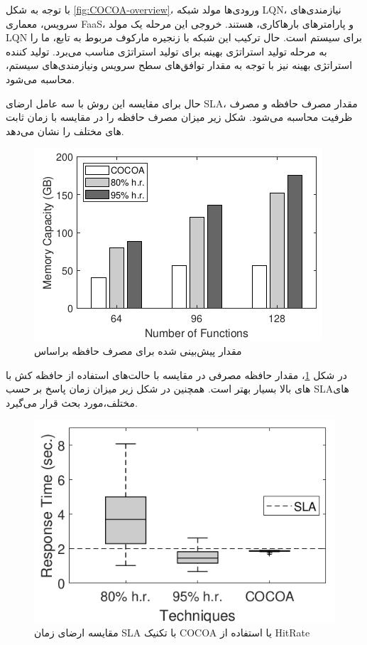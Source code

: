 با توجه به شکل \ref{fig:COCOA-overview}، ورودی‌ها مولد شبکه LQN، نیازمندی‌های سرویس، معماری FaaS، و پارامتر‌های بار‌ها‌کاری، هستند. خروجی این مرحله یک مولد LQN برای سیستم است. حال ترکیب این شبکه با زنجیره مارکوف مربوط به تابع، ما را به مرحله تولید استراتژی بهینه برای تولید استراتژی مناسب می‌برد. تولید کننده استراتژی بهینه نیز با توجه به مقدار توافق‌های سطح سرویس ونیازمندی‌های سیستم، محاسبه می‌شود. 

حال برای مقایسه این روش با  سه عامل ارضای SLA، مقدار مصرف حافظه و مصرف ظرفیت محاسبه می‌شود. 
شکل زیر میزان مصرف حافظه را در مقایسه با زمان ثابت های مختلف را نشان می‌دهد. 

\begin{figure}
	\centering
	\includegraphics[width=0.7\linewidth]{figs/COCOA-memory-predicted-capacity}
	\caption {مقدار پیش‌بینی شده برای مصرف حافظه براساس }
	\label{fig:COCOA-memory-predicted-capacity}
\end{figure}

در شکل \ref{fig:COCOA-memory-predicted-capacity}، مقدار حافظه مصرفی در مقایسه با حالت‌های استفاده از حافظه کش با  های بالا بسیار بهتر است. همچنین در شکل زیر میزان زمان پاسخ بر حسب SLAهای مختلف،مورد بحث قرار می‌گیرد. 

\begin{figure}
	\centering
	\includegraphics[width=0.7\linewidth]{figs/COCOA-Hitrate}
	\caption {مقایسه ارضای زمان SLA با تکنیک COCOA یا استفاده از HitRate}
	\label{fig:COCOA-Hitrate}
\end{figure}

